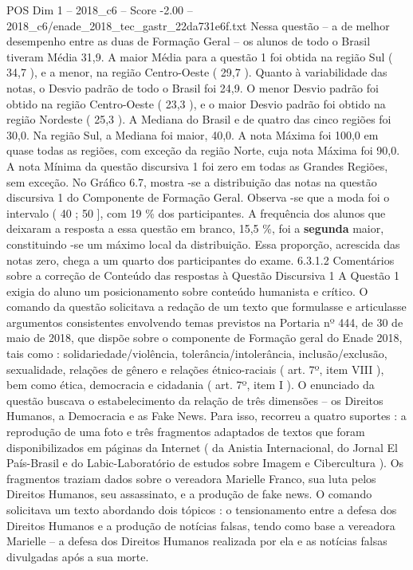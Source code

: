\begin{textsample}{POS Dim 1 – 2018\_c6 – Score -2.00 – 2018\_c6/enade\_2018\_tec\_gastr\_22da731e6f.txt}
Nessa questão – a de melhor desempenho entre as duas de Formação Geral – os alunos de todo o Brasil tiveram Média 31,9.
A maior Média para a questão 1 foi obtida na região Sul ( 34,7 ), e a menor, na região Centro-Oeste ( 29,7 ).
Quanto à variabilidade das notas, o Desvio padrão de todo o Brasil foi 24,9.
O menor Desvio padrão foi obtido na região Centro-Oeste ( 23,3 ), e o maior Desvio padrão foi obtido na região Nordeste ( 25,3 ).
A Mediana do Brasil e de quatro das cinco regiões foi 30,0.
Na região Sul, a Mediana foi maior, 40,0.
A nota Máxima foi 100,0 em quase todas as regiões, com exceção da região Norte, cuja nota Máxima foi 90,0.
A nota Mínima da questão discursiva 1 foi zero em todas as Grandes Regiões, sem exceção.
No Gráfico 6.7, mostra -se a distribuição das notas na questão discursiva 1 do Componente de Formação Geral.
Observa -se que a moda foi o intervalo ( 40 ; 50 ], com 19 \% dos participantes.
A frequência dos alunos que deixaram a resposta a essa questão em branco, 15,5 \%, foi a \textbf{segunda} maior, constituindo -se um máximo local da distribuição.
Essa proporção, acrescida das notas zero, chega a um quarto dos participantes do exame. 6.3.1.2 Comentários sobre a correção de Conteúdo das respostas à Questão Discursiva 1 A Questão 1 exigia do aluno um posicionamento sobre conteúdo humanista e crítico.
O comando da questão solicitava a redação de um texto que formulasse e articulasse argumentos consistentes envolvendo temas previstos na Portaria nº 444, de 30 de maio de 2018, que dispõe sobre o componente de Formação geral do Enade 2018, tais como : solidariedade/violência, tolerância/intolerância, inclusão/exclusão, sexualidade, relações de gênero e relações étnico-raciais ( art. 7º, item VIII ), bem como ética, democracia e cidadania ( art. 7º, item I ).
O enunciado da questão buscava o estabelecimento da relação de três dimensões – os Direitos Humanos, a Democracia e as Fake News.
Para isso, recorreu a quatro suportes : a reprodução de uma foto e três fragmentos adaptados de textos que foram disponibilizados em páginas da Internet ( da Anistia Internacional, do Jornal El País-Brasil e do Labic-Laboratório de estudos sobre Imagem e Cibercultura ).
Os fragmentos traziam dados sobre o vereadora Marielle Franco, sua luta pelos Direitos Humanos, seu assassinato, e a produção de fake news.
O comando solicitava um texto abordando dois tópicos : o tensionamento entre a defesa dos Direitos Humanos e a produção de notícias falsas, tendo como base a vereadora Marielle – a defesa dos Direitos Humanos realizada por ela e as notícias falsas divulgadas após a sua morte.

\end{textsample}

